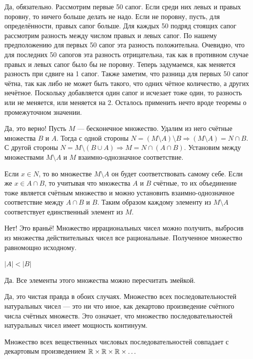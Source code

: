 \begin{solution}{1.16}
 Да, обязательно. Рассмотрим первые 50 сапог. Если среди них левых и правых поровну, то ничего больше делать не надо. Если не поровну, пусть, для определённости, правых сапог больше. Для каждых 50 подряд стоящих сапог рассмотрим разность между числом правых и левых сапог. По нашему предположению для первых 50 сапог эта разность положительна. Очевидно, что для последних 50 сапогов эта разность отрицательна, так как в противном случае правых и левых сапог было бы не поровну. Теперь задумаемся, как меняется разность при сдвиге на 1 сапог. Также заметим, что разница для первых 50 сапог чётна, так как либо не может быть такого, что одних чётное количество, а других нечётное. Поскольку добавляется один сапог и исчезает тоже один, то разность или не меняется, или меняется на 2. Осталось применить нечто вроде теоремы о промежуточном значении.
\end{solution}
\begin{solution}{1.17}
Да, это верно! Пусть $M$ --- бесконечное множество. Удалим из него счётные множества $B$ и $A$. Тогда с одной стороны $N = (M\setminus A)\setminus B \Rightarrow (M \setminus A) = N \cap B $. С другой стороны $N = M \setminus (B \cup A) \Rightarrow M = N \cap (A \cap B)$. Установим между множествами $M\setminus A$ и $M$ взаимно-однозначное соответствие.

Если $x \in N$, то во множестве  $M\setminus A$ он будет соответствовать самому себе. Если же $x \in A \cap B$, то учитывая что множества $A$ и $B$ счётные, то их объединение тоже является счётным множество и можно установить взаимно-однозначное соответствие между $A \cap B$ и $B$. Таким образом каждому элементу из $M\setminus A$ соответствует единственный элемент из $M$.
\end{solution}
\begin{solution}{1.18}
Нет! Это враньё! Множество иррациональных чисел можно получить, выбросив из множества действительных чисел все рациональные. Полученное множество равномощно исходному.
\end{solution}
\begin{solution}{1.19}
$|A| <|B|$
\end{solution}
\begin{solution}{1.20}
Да. Все элементы этого множества можно пересчитать змейкой.
\end{solution}
\begin{solution}{1.21}

Да, это чистая правда в обоих случаях. Множество всех последовательностей натуральных чисел --- это ни что иное, как декартово произведение счётного числа счётных множеств. Это означает, что множество последовательностей натуральных чисел имеет мощность континуум.

Множество всех вещественных числовых последовательностей совпадает с декартовым произведением $\mathbb R \times \mathbb R \times \mathbb R \times \ldots$
\end{solution}
